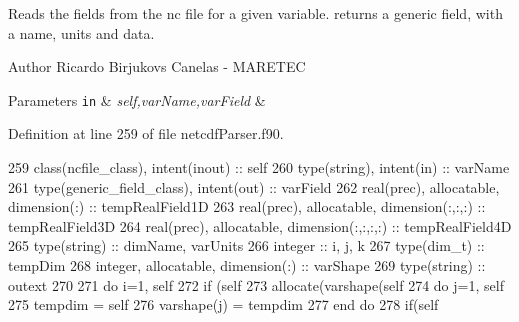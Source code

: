 Reads the fields from the nc file for a given variable. returns a generic field, with a name, units and data. 

\begin{DoxyAuthor}{Author}
Ricardo Birjukovs Canelas -\/ M\+A\+R\+E\+T\+EC 
\end{DoxyAuthor}

\begin{DoxyParams}[1]{Parameters}
\mbox{\tt in}  & {\em self,var\+Name,var\+Field} & \\
\hline
\end{DoxyParams}


Definition at line 259 of file netcdf\+Parser.\+f90.


\begin{DoxyCode}
259     \textcolor{keywordtype}{class}(ncfile\_class), \textcolor{keywordtype}{intent(inout)} :: self
260     \textcolor{keywordtype}{type}(string), \textcolor{keywordtype}{intent(in)} :: varName
261     \textcolor{keywordtype}{type}(generic\_field\_class), \textcolor{keywordtype}{intent(out)} :: varField
262     \textcolor{keywordtype}{real(prec)}, \textcolor{keywordtype}{allocatable}, \textcolor{keywordtype}{dimension(:)} :: tempRealField1D
263     \textcolor{keywordtype}{real(prec)}, \textcolor{keywordtype}{allocatable}, \textcolor{keywordtype}{dimension(:,:,:)} :: tempRealField3D
264     \textcolor{keywordtype}{real(prec)}, \textcolor{keywordtype}{allocatable}, \textcolor{keywordtype}{dimension(:,:,:,:)} :: tempRealField4D
265     \textcolor{keywordtype}{type}(string) :: dimName, varUnits
266     \textcolor{keywordtype}{integer} :: i, j, k
267     \textcolor{keywordtype}{type}(dim\_t) :: tempDim
268     \textcolor{keywordtype}{integer}, \textcolor{keywordtype}{allocatable}, \textcolor{keywordtype}{dimension(:)} :: varShape
269     \textcolor{keywordtype}{type}(string) :: outext
270 
271     \textcolor{keywordflow}{do} i=1, self%
272         \textcolor{keywordflow}{if} (self%
273             \textcolor{keyword}{allocate}(varshape(self%
274             \textcolor{keywordflow}{do} j=1, self%
275                 tempdim = self%
276                 varshape(j) = tempdim%
277 \textcolor{keywordflow}{            end do}
278             \textcolor{keywordflow}{if}(self%

\end{DoxyCode}

